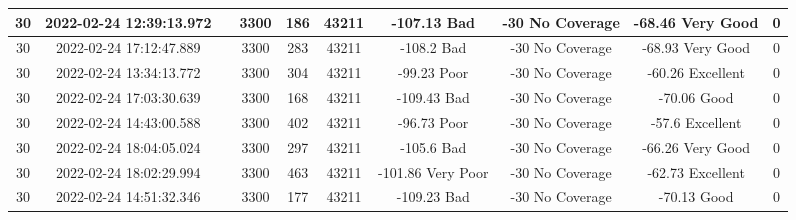 \begin{longtable*}{|c|c|c|c|c|c|c|c|c|c|}
30&2022-02-24 12:39:13.972&&3300&186&43211& -107.13   Bad         & -30       No Coverage & -68.46    Very Good   & 0\\\hline
{}30&2022-02-24 17:12:47.889&&3300&283&43211& -108.2    Bad         & -30       No Coverage & -68.93    Very Good   & 0\\\hline
{}30&2022-02-24 13:34:13.772&&3300&304&43211& -99.23    Poor        & -30       No Coverage & -60.26    Excellent   & 0\\\hline
{}30&2022-02-24 17:03:30.639&&3300&168&43211& -109.43   Bad         & -30       No Coverage & -70.06    Good        & 0\\\hline
{}30&2022-02-24 14:43:00.588&&3300&402&43211& -96.73    Poor        & -30       No Coverage & -57.6     Excellent   & 0\\\hline
{}30&2022-02-24 18:04:05.024&&3300&297&43211& -105.6    Bad         & -30       No Coverage & -66.26    Very Good   & 0\\\hline
{}30&2022-02-24 18:02:29.994&&3300&463&43211& -101.86   Very Poor   & -30       No Coverage & -62.73    Excellent   & 0\\\hline
{}30&2022-02-24 14:51:32.346&&3300&177&43211& -109.23   Bad         & -30       No Coverage & -70.13    Good        & 0\\\hline

\end{longtable*}

